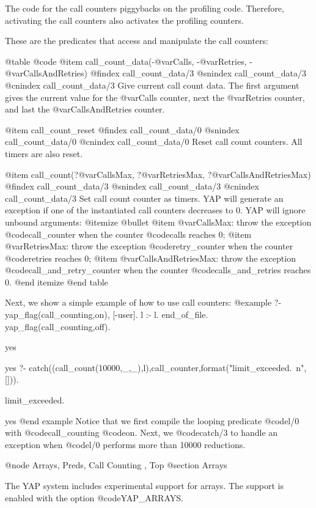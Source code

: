 {{{{{{{The code for the call counters piggybacks on the profiling
code. Therefore, activating the call counters also activates the profiling
counters.

These are  the predicates that access and manipulate the call counters:

@table @code
@item call_count_data(-@var{Calls}, -@var{Retries}, -@var{CallsAndRetries})
@findex call_count_data/3
@snindex call_count_data/3
@cnindex call_count_data/3
Give current call count data. The first argument gives the current value
for the @var{Calls} counter, next the @var{Retries} counter, and last
the @var{CallsAndRetries} counter.

@item call_count_reset
@findex call_count_data/0
@snindex call_count_data/0
@cnindex call_count_data/0
Reset call count counters. All timers are also reset.

@item call_count(?@var{CallsMax}, ?@var{RetriesMax}, ?@var{CallsAndRetriesMax})
@findex call_count_data/3
@snindex call_count_data/3
@cnindex call_count_data/3
Set call count counter as timers. YAP will generate an exception
if one of the instantiated call counters decreases to 0. YAP will ignore
unbound arguments:
@itemize @bullet
@item @var{CallsMax}: throw the exception @code{call_counter} when the
counter @code{calls} reaches 0;
@item @var{RetriesMax}: throw the exception @code{retry_counter} when the
counter @code{retries} reaches 0;
@item @var{CallsAndRetriesMax}: throw the exception
@code{call_and_retry_counter} when the counter @code{calls_and_retries}
reaches 0.
@end itemize
@end table

Next, we show a simple example of how to use call counters:
@example
   ?- yap_flag(call_counting,on), [-user]. l :- l. end_of_file. yap_flag(call_counting,off).

yes

yes
   ?- catch((call_count(10000,_,_),l),call_counter,format("limit_exceeded.~n",[])).

limit_exceeded.

yes
@end example
Notice that we first compile the looping predicate @code{l/0} with
@code{call_counting} @code{on}. Next, we @code{catch/3} to handle an
exception when @code{l/0} performs more than 10000 reductions.


@node Arrays, Preds, Call Counting , Top
@section Arrays

The YAP system includes experimental support for arrays. The
support is enabled with the option @code{YAP_ARRAYS}.

}}}}}}}
